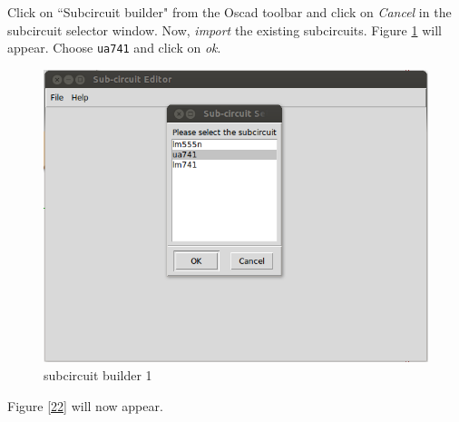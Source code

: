 \begin{enumerate}
Click on ``Subcircuit builder" from the Oscad toolbar and click on \textit{Cancel} in the subcircuit selector window. Now, \textit{import} the existing subcircuits. Figure \ref{21} will appear. Choose {\tt ua741} and click on \textit{ok}.
\begin{figure}%
\begin{center}
\includegraphics[width=1\linewidth]{figures/apd21.png}%
\caption{subcircuit builder 1}
\label{21}
\end{center}
\end{figure}
Figure \ref{22} will now appear.


\end{enumerate}
